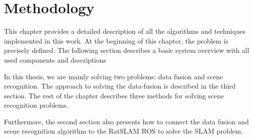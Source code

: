 \chapter{Methodology}\label{chapter:methodology}

This chapter provides a detailed description of all the algorithms and techniques implemented in this work. At the beginning of this chapter, the problem is precisely defined. The following section describes a basic system overview with all used components and descriptions\par
In this thesis, we are mainly solving two problems: data fusion and scene recognition. The approach to solving the data-fusion is described in the third section. The rest of the chapter describes three methods for solving scene recognition problems.\par
Furthermore, the second section also presents how to connect the data fusion and scene recognition algorithm to the RatSLAM ROS to solve the SLAM problem.








